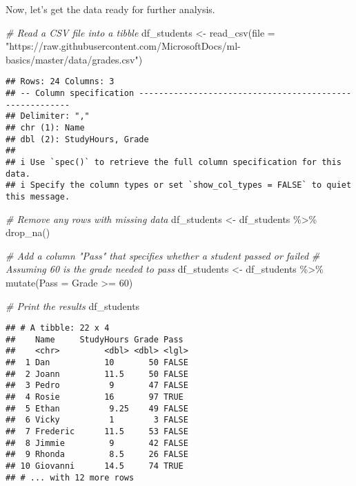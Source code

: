 \documentclass[
]{article}
\newenvironment{Shaded}{\begin{snugshade}}{\end{snugshade}}
\newcommand{\AttributeTok}[1]{\textcolor[rgb]{0.77,0.63,0.00}{#1}}
\newcommand{\CommentTok}[1]{\textcolor[rgb]{0.56,0.35,0.01}{\textit{#1}}}
\newcommand{\DecValTok}[1]{\textcolor[rgb]{0.00,0.00,0.81}{#1}}
\newcommand{\FunctionTok}[1]{\textcolor[rgb]{0.00,0.00,0.00}{#1}}
\newcommand{\NormalTok}[1]{#1}
\newcommand{\OtherTok}[1]{\textcolor[rgb]{0.56,0.35,0.01}{#1}}
\newcommand{\SpecialCharTok}[1]{\textcolor[rgb]{0.00,0.00,0.00}{#1}}
\newcommand{\StringTok}[1]{\textcolor[rgb]{0.31,0.60,0.02}{#1}}
\begin{document}
Now, let's get the data ready for further analysis.

\begin{Shaded}
\begin{Highlighting}[]
\CommentTok{\# Read a CSV file into a tibble}
\NormalTok{df\_students }\OtherTok{\textless{}{-}} \FunctionTok{read\_csv}\NormalTok{(}\AttributeTok{file =} \StringTok{"https://raw.githubusercontent.com/MicrosoftDocs/ml{-}basics/master/data/grades.csv"}\NormalTok{)}
\end{Highlighting}
\end{Shaded}

\begin{verbatim}
## Rows: 24 Columns: 3
## -- Column specification --------------------------------------------------------
## Delimiter: ","
## chr (1): Name
## dbl (2): StudyHours, Grade
## 
## i Use `spec()` to retrieve the full column specification for this data.
## i Specify the column types or set `show_col_types = FALSE` to quiet this message.
\end{verbatim}

\begin{Shaded}
\begin{Highlighting}[]
\CommentTok{\# Remove any rows with missing data}
\NormalTok{df\_students }\OtherTok{\textless{}{-}}\NormalTok{ df\_students }\SpecialCharTok{\%\textgreater{}\%} 
  \FunctionTok{drop\_na}\NormalTok{()}

\CommentTok{\# Add a column "Pass" that specifies whether a student passed or failed}
\CommentTok{\# Assuming \textquotesingle{}60\textquotesingle{} is the grade needed to pass}
\NormalTok{df\_students }\OtherTok{\textless{}{-}}\NormalTok{ df\_students }\SpecialCharTok{\%\textgreater{}\%} 
  \FunctionTok{mutate}\NormalTok{(}\AttributeTok{Pass =}\NormalTok{ Grade }\SpecialCharTok{\textgreater{}=} \DecValTok{60}\NormalTok{)}

\CommentTok{\# Print the results}
\NormalTok{df\_students}
\end{Highlighting}
\end{Shaded}

\begin{verbatim}
## # A tibble: 22 x 4
##    Name     StudyHours Grade Pass 
##    <chr>         <dbl> <dbl> <lgl>
##  1 Dan           10       50 FALSE
##  2 Joann         11.5     50 FALSE
##  3 Pedro          9       47 FALSE
##  4 Rosie         16       97 TRUE 
##  5 Ethan          9.25    49 FALSE
##  6 Vicky          1        3 FALSE
##  7 Frederic      11.5     53 FALSE
##  8 Jimmie         9       42 FALSE
##  9 Rhonda         8.5     26 FALSE
## 10 Giovanni      14.5     74 TRUE 
## # ... with 12 more rows
\end{verbatim}
\end{document}
